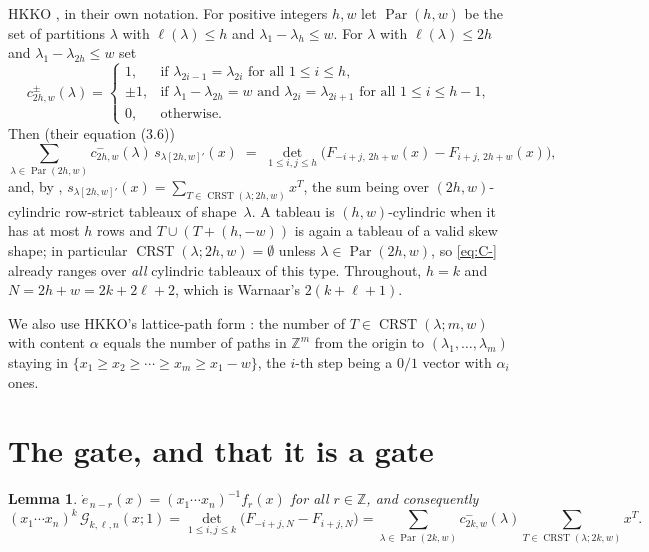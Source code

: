 \documentclass[11pt]{article}
\newtheorem{lemma}[theorem]{Lemma}
\theoremstyle{definition}
\DeclareMathOperator{\Par}{Par}
\DeclareMathOperator{\CRST}{CRST}
\newcommand{\la}{\lambda}
\newcommand{\Z}{\mathbb{Z}}
\newcommand{\edot}{\dot{e}}
\begin{document}
HKKO \cite[Thm.~3.3]{HKKO}, in their own notation. For positive integers $h,w$
let $\Par(h,w)$ be the set of partitions $\la$ with $\ell(\la)\le h$ and
$\la_1-\la_h\le w$. For $\la$ with $\ell(\la)\le 2h$ and $\la_1-\la_{2h}\le w$ set
\begin{equation}\label{eq:cminus}
c^{\pm}_{2h,w}(\la)=
\begin{cases}
1,&\text{if }\la_{2i-1}=\la_{2i}\text{ for all }1\le i\le h,\\
\pm1,&\text{if }\la_1-\la_{2h}=w\text{ and }\la_{2i}=\la_{2i+1}\text{ for all }1\le i\le h-1,\\
0,&\text{otherwise.}
\end{cases}
\end{equation}
Then (their equation (3.6))
\begin{equation}\label{eq:C-}
  \sum_{\la\in\Par(2h,w)}c^{-}_{2h,w}(\la)\,s_{\la[2h,w]'}(x)
  \;=\;\det_{1\le i,j\le h}\bigl(F_{-i+j,\,2h+w}(x)-F_{i+j,\,2h+w}(x)\bigr),
\end{equation}
and, by \cite[Prop.~2.9]{HKKO},
$s_{\la[2h,w]'}(x)=\sum_{T\in\CRST(\la;2h,w)}x^{T}$, the sum being over
$(2h,w)$-cylindric row-strict tableaux of shape~$\la$. A tableau is
$(h,w)$-cylindric when it has at most $h$ rows and $T\cup(T+(h,-w))$ is again a
tableau of a valid skew shape; in particular $\CRST(\la;2h,w)=\emptyset$ unless
$\la\in\Par(2h,w)$, so \eqref{eq:C-} already ranges over \emph{all} cylindric
tableaux of this type. Throughout, $h=k$ and $N=2h+w=2k+2\ell+2$, which is
Warnaar's $2(k+\ell+1)$.

We also use HKKO's lattice-path form \cite[Prop.~2.7]{HKKO}: the number of
$T\in\CRST(\la;m,w)$ with content $\alpha$ equals the number of paths in $\Z^m$
from the origin to $(\la_1,\dots,\la_m)$ staying in
$\{x_1\ge x_2\ge\cdots\ge x_m\ge x_1-w\}$, the $i$-th step being a $0/1$ vector
with $\alpha_i$ ones.

\section{The gate, and that it is a gate}

\begin{lemma}\label{lem:t1}
$\edot_{\,n-r}(x)=(x_1\cdots x_n)^{-1}f_r(x)$ for all $r\in\Z$, and consequently
\[
 (x_1\cdots x_n)^{k}\,\mathcal G_{k,\ell,n}(x;1)
 =\det_{1\le i,j\le k}\bigl(F_{-i+j,N}-F_{i+j,N}\bigr)
 =\sum_{\la\in\Par(2k,w)}c^{-}_{2k,w}(\la)\!\!\sum_{T\in\CRST(\la;2k,w)}\!\!x^{T}.
\]
\end{lemma}
\end{document}
